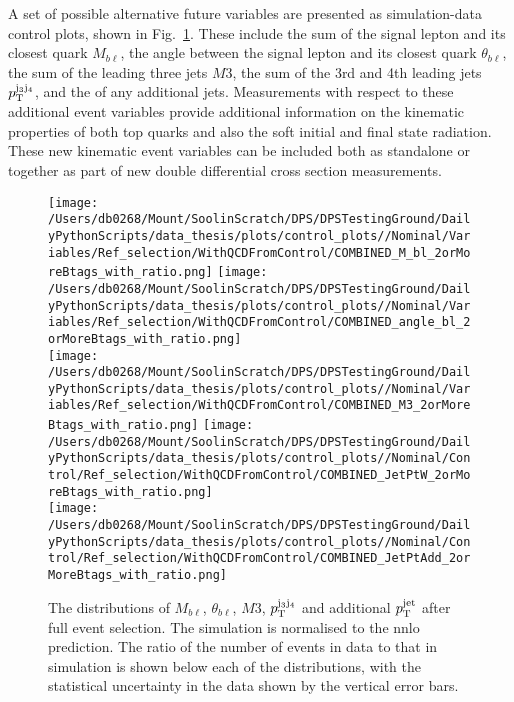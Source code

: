 A set of possible alternative future variables are presented as simulation-data control plots, shown in Fig.~\ref{fig:FutureVars}.
These include the \pt{} sum of the signal lepton and its closest \bquark{} quark $M_{b\ell}$, the angle between the signal lepton and its closest \bquark{} quark $\theta_{b\ell}$, the \pt{} sum of the leading three jets $M3$, the \pt{} sum of the 3rd and 4th leading jets $\pt^{\mathrm{j_{3}j_{4}}}$, and the \pt{} of any additional jets.
Measurements with respect to these additional event variables provide additional information on the kinematic properties of both top quarks and also the soft initial and final state radiation.
These new kinematic event variables can be included both as standalone or together as part of new double differential cross section measurements.

\begin{figure}[htpb]
	\centering
	\texttt{[image: /Users/db0268/Mount/SoolinScratch/DPS/DPSTestingGround/DailyPythonScripts/data\_thesis/plots/control\_plots//Nominal/Variables/Ref\_selection/WithQCDFromControl/COMBINED\_M\_bl\_2orMoreBtags\_with\_ratio.png]}
	\texttt{[image: /Users/db0268/Mount/SoolinScratch/DPS/DPSTestingGround/DailyPythonScripts/data\_thesis/plots/control\_plots//Nominal/Variables/Ref\_selection/WithQCDFromControl/COMBINED\_angle\_bl\_2orMoreBtags\_with\_ratio.png]} \\
	\texttt{[image: /Users/db0268/Mount/SoolinScratch/DPS/DPSTestingGround/DailyPythonScripts/data\_thesis/plots/control\_plots//Nominal/Variables/Ref\_selection/WithQCDFromControl/COMBINED\_M3\_2orMoreBtags\_with\_ratio.png]}
	\texttt{[image: /Users/db0268/Mount/SoolinScratch/DPS/DPSTestingGround/DailyPythonScripts/data\_thesis/plots/control\_plots//Nominal/Control/Ref\_selection/WithQCDFromControl/COMBINED\_JetPtW\_2orMoreBtags\_with\_ratio.png]} \\
	\texttt{[image: /Users/db0268/Mount/SoolinScratch/DPS/DPSTestingGround/DailyPythonScripts/data\_thesis/plots/control\_plots//Nominal/Control/Ref\_selection/WithQCDFromControl/COMBINED\_JetPtAdd\_2orMoreBtags\_with\_ratio.png]}\\
	\caption[The distributions of $M_{b\ell}$, $\theta_{b\ell}$, $M3$, $\pt^{\mathrm{j_{3}j_{4}}}$ and additional $\pt^{\mathrm{jet}}$ after full event selection. The \ttbar{} simulation is normalised to the \acrshort{nnlo} prediction. The ratio of the number of events in data to that in simulation is shown below each of the distributions, with the statistical uncertainty in the data shown by the vertical error bars.]{The distributions of $M_{b\ell}$, $\theta_{b\ell}$, $M3$, $\pt^{\mathrm{j_{3}j_{4}}}$ and additional $\pt^{\mathrm{jet}}$ after full event selection. The \ttbar{} simulation is normalised to the \acrshort{nnlo} prediction. The ratio of the number of events in data to that in simulation is shown below each of the distributions, with the statistical uncertainty in the data shown by the vertical error bars.}
	\label{fig:FutureVars}
\end{figure}


